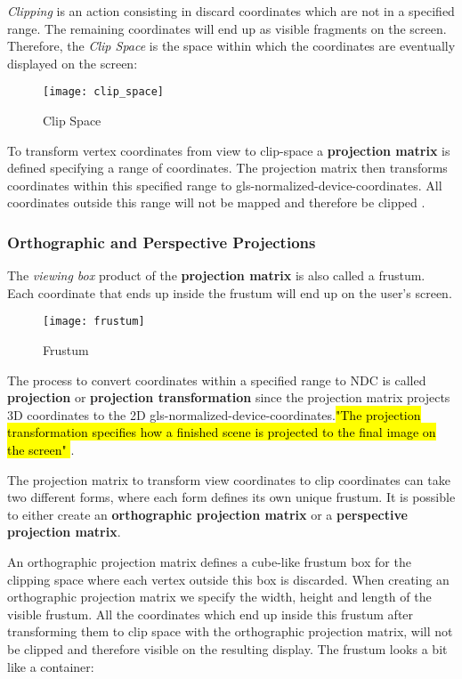 \emph{Clipping} is an action consisting in discard coordinates which are not in a specified range. The remaining coordinates will end up as visible fragments on the screen. Therefore, the \emph{Clip Space} is the space within which the coordinates are eventually displayed on the screen:

\begin{figure}[h!]
	\centering
	\texttt{[image: clip\_space]}
	\caption{Clip Space \cite{superbible}}
	\label{fig:clip-space}
\end{figure}

To transform vertex coordinates from view to clip-space a \textbf{projection matrix} is defined specifying a range of coordinates. The projection matrix then transforms coordinates within this specified range to \gls{gls-normalized-device-coordinates}. All coordinates outside this range will not be mapped and therefore be clipped \cite{learnopengl}. 


\subsubsection{Orthographic and Perspective Projections} \label{projections}

The \emph{viewing box} product of the \textbf{projection matrix} is also called a \gls{frustum}. Each coordinate that ends up inside the frustum will end up on the user's screen.

\begin{figure}[h!]
	\centering
	\texttt{[image: frustum]}
	\caption{Frustum \cite{realtutorials}}
	\label{fig:frustum}
\end{figure}

The process to convert coordinates within a specified range to \gls{NDC} is called \textbf{projection} or \textbf{projection transformation} since the projection matrix projects 3D coordinates to the 2D \gls{gls-normalized-device-coordinates}.\hl {"The projection transformation specifies how a finished scene is projected to the final image on the screen" \cite{superbible}}. 

The projection matrix to transform view coordinates to clip coordinates can take two different forms, where each form defines its own unique frustum. It is possible to either create an \textbf{orthographic projection matrix} or a \textbf{perspective projection matrix}.


An orthographic projection matrix defines a cube-like frustum box for the clipping space where each vertex outside this box is discarded. 
When creating an orthographic projection matrix we specify the width, height and length of the visible frustum. All the coordinates which end up inside this frustum after transforming them to clip space with the orthographic projection matrix, will not be clipped and therefore visible on the resulting display. The frustum looks a bit like a container:


